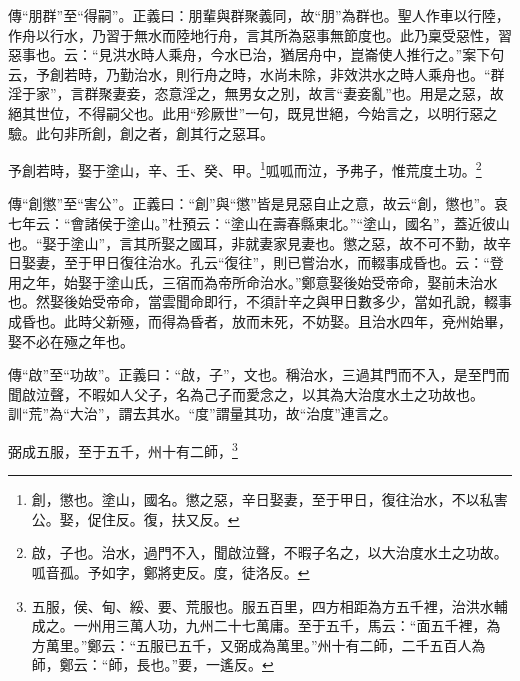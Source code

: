 {\noindent\zhuan{}\fzbyks 傳“朋群”至“得嗣”。正義曰：朋輩與群聚義同，故“朋”為群也。聖人作車以行陸，作舟以行水，乃習于無水而陸地行舟，言其所為惡事無節度也。此乃稟受惡性，習惡事也。云：“見洪水時人乘舟，今水已治，猶居舟中，崑崙使人推行之。”案下句云，予創若時，乃勤治水，則行舟之時，水尚未除，非效洪水之時人乘舟也。“群淫于家”，言群聚妻妾，恣意淫之，無男女之別，故言“妻妾亂”也。用是之惡，故絕其世位，不得嗣父也。此用“殄厥世”一句，既見世絕，今始言之，以明行惡之驗。此句非所創，創之者，創其行之惡耳。 \par}

予創若時，娶于塗山，辛、壬、癸、甲。\footnote{創，懲也。塗山，國名。懲之惡，辛日娶妻，至于甲日，復往治水，不以私害公。娶，促住反。復，扶又反。}呱呱而泣，予弗子，惟荒度土功。\footnote{啟，子也。治水，過門不入，聞啟泣聲，不暇子名之，以大治度水土之功故。呱音孤。予如字，鄭將吏反。度，徒洛反。}


{\noindent\zhuan{}\fzbyks 傳“創懲”至“害公”。正義曰：“創”與“懲”皆是見惡自止之意，故云“創，懲也”。哀七年云：“會諸侯于塗山。”杜預云：“塗山在壽春縣東北。”“塗山，國名”，蓋近彼山也。“娶于塗山”，言其所娶之國耳，非就妻家見妻也。懲之惡，故不可不勤，故辛日娶妻，至于甲日復往治水。孔云“復往”，則已嘗治水，而輟事成昏也。云：“登用之年，始娶于塗山氏，三宿而為帝所命治水。”鄭意娶後始受帝命，娶前未治水也。然娶後始受帝命，當雲聞命即行，不須計辛之與甲日數多少，當如孔說，輟事成昏也。此時父新殛，而得為昏者，放而未死，不妨娶。且治水四年，兗州始畢，娶不必在殛之年也。 \par}

{\noindent\zhuan{}\fzbyks 傳“啟”至“功故”。正義曰：“啟，子”，文也。稱治水，三過其門而不入，是至門而聞啟泣聲，不暇如人父子，名為己子而愛念之，以其為大治度水土之功故也。訓“荒”為“大治”，謂去其水。“度”謂量其功，故“治度”連言之。 \par}

弼成五服，至于五千，州十有二師，\footnote{五服，侯、甸、綏、要、荒服也。服五百里，四方相距為方五千裡，治洪水輔成之。一州用三萬人功，九州二十七萬庸。至于五千，馬云：“面五千裡，為方萬里。”鄭云：“五服已五千，又弼成為萬里。”州十有二師，二千五百人為師，鄭云：“師，長也。”要，一遙反。}


